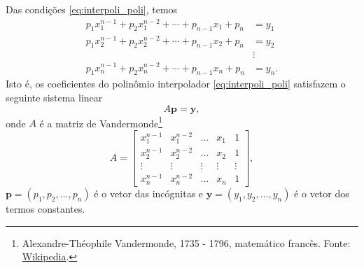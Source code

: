 Das condições \eqref{eq:interpoli_poli}, temos
\begin{align}\label{eq:interpoli_sis}
  p_1x_1^{n-1} + p_2x_1^{n-2} + \cdots + p_{n-1}x_1 + p_n &= y_1 \\
  p_1x_2^{n-1} + p_2x_2^{n-2} + \cdots + p_{n-1}x_2 + p_n &= y_2 \\
  &\vdots \\
  p_1x_n^{n-1} + p_2x_n^{n-2} + \cdots + p_{n-1}x_n + p_n &= y_n.
\end{align}
Isto é, os coeficientes do polinômio interpolador \eqref{eq:interpoli_poli} satisfazem o seguinte sistema linear
\begin{equation}
  A\pmb{p} = \pmb{y},
\end{equation}
onde $A$ é a matriz de Vandermonde\footnote{Alexandre-Théophile Vandermonde, 1735 - 1796, matemático francês. Fonte: \href{https://en.wikipedia.org/wiki/Alexandre-Th\%C3\%A9ophile_Vandermonde}{Wikipedia}.}
\begin{equation}
  A =
  \begin{bmatrix}
    x_1^{n-1} & x_1^{n-2} & \ldots & x_1 & 1 \\
    x_2^{n-1} & x_2^{n-2} & \ldots & x_2 & 1 \\
    \vdots  & \vdots  & \vdots  & \vdots & \vdots \\
    x_n^{n-1} & x_n^{n-2} & \ldots & x_n & 1
  \end{bmatrix},
\end{equation}
$\pmb{p} = (p_1, p_2, \ldots, p_n)$ é o vetor das incógnitas e $\pmb{y} = (y_1, y_2, \ldots, y_n)$ é o vetor dos termos constantes.

